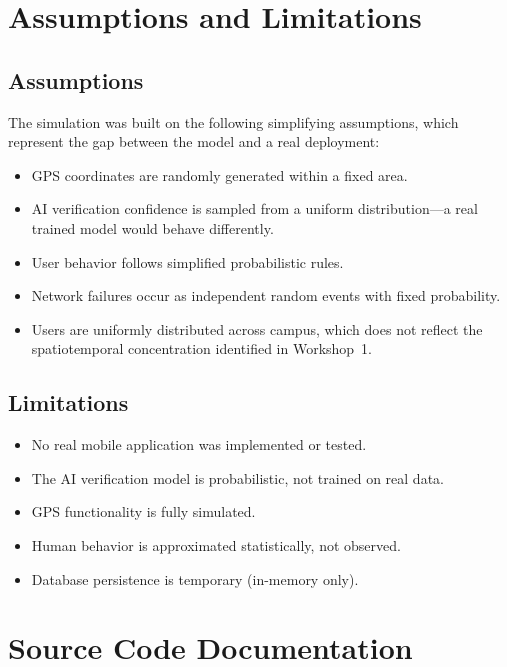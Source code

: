 \documentclass[conference,a4paper,10pt]{IEEEtran}
\begin{document}
\section{Assumptions and Limitations}

\subsection{Assumptions}

The simulation was built on the following simplifying assumptions,
which represent the gap between the model and a real deployment:

\begin{itemize}
  \item GPS coordinates are randomly generated within a fixed area.
  \item AI verification confidence is sampled from a uniform
    distribution---a real trained model would behave differently.
  \item User behavior follows simplified probabilistic rules.
  \item Network failures occur as independent random events with
    fixed probability.
  \item Users are uniformly distributed across campus, which does not
    reflect the spatiotemporal concentration identified in Workshop~1.
\end{itemize}

\subsection{Limitations}

\begin{itemize}
  \item No real mobile application was implemented or tested.
  \item The AI verification model is probabilistic, not trained on
    real data.
  \item GPS functionality is fully simulated.
  \item Human behavior is approximated statistically, not observed.
  \item Database persistence is temporary (in-memory only).
\end{itemize}

\section{Source Code Documentation}
\end{document}

